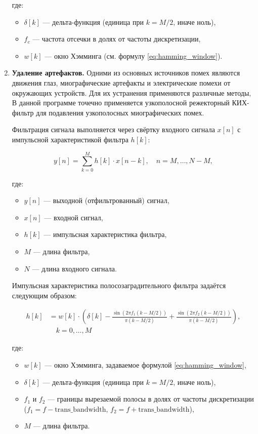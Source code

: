 \begin{enumerate}
где:
\begin{itemize}
    \item \(\delta[k]\) — дельта-функция (единица при \(k = M/2\), иначе ноль),
    \item \(f_c\) — частота отсечки в долях от частоты дискретизации,
    \item \(w[k]\) — окно Хэмминга (см. формулу \eqref{eq:hamming_window}).
\end{itemize}

\item \textbf{Удаление артефактов.}
\newline
Одними из основных источников помех являются движения глаз, миографические артефакты и электрические помехи от окружающих устройств. Для их устранения применяются различные методы,
В данной программе точечно применяется узкополосной режекторный КИХ-фильтр для подавления узкополосных миографических помех.

Фильтрация сигнала выполняется через свёртку входного сигнала \(x[n]\) с импульсной характеристикой фильтра \(h[k]\):

\begin{equation}
y[n] = \sum_{k=0}^{M} h[k] \cdot x[n-k], \quad n = M, \dots, N-M,
\label{eq:notch_filter}
\end{equation}

где:
\begin{itemize}
    \item \(y[n]\) — выходной (отфильтрованный) сигнал,
    \item \(x[n]\) — входной сигнал,
    \item \(h[k]\) — импульсная характеристика фильтра,
    \item \(M\) — длина фильтра,
    \item \(N\) — длина входного сигнала.
\end{itemize}

Импульсная характеристика полосозаградительного фильтра задаётся следующим образом:

\begin{equation}
\begin{split}
h[k] &= w[k] \cdot \left( \delta[k] - \frac{\sin(2 \pi f_1 (k - M/2))}{\pi (k - M/2)} + \frac{\sin(2 \pi f_2 (k - M/2))}{\pi (k - M/2)} \right), \\
& \quad k = 0, \dots, M
\end{split}
\end{equation}

где:
\begin{itemize}
    \item \(w[k]\) — окно Хэмминга, задаваемое формулой \eqref{eq:hamming_window},
    \item \(\delta[k]\) — дельта-функция (единица при \(k = M/2\), иначе ноль),
    \item \(f_1\) и \(f_2\) — границы вырезаемой полосы в долях от частоты дискретизации (\(f_1 = f - \text{trans\_bandwidth}\), \(f_2 = f + \text{trans\_bandwidth}\)),
    \item \(M\) — длина фильтра.
\end{itemize}


\end{enumerate}
